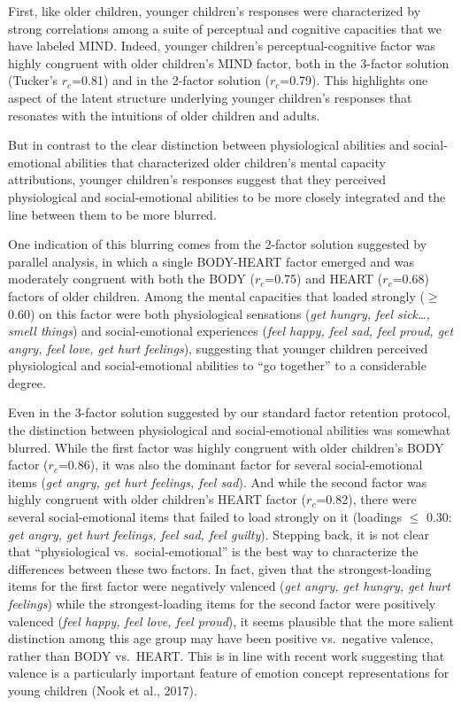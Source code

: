 \documentclass[10pt, letterpaper]{article}
\begin{document}
First, like older children, younger children's responses were
characterized by strong correlations among a suite of perceptual and
cognitive capacities that we have labeled MIND. Indeed, younger
children's perceptual-cognitive factor was highly congruent with older
children's MIND factor, both in the 3-factor solution (Tucker's
\emph{\(r_c\)}=0.81) and in the 2-factor solution (\emph{\(r_c\)}=0.79).
This highlights one aspect of the latent structure underlying younger
children's responses that resonates with the intuitions of older
children and adults.

But in contrast to the clear distinction between physiological abilities
and social-emotional abilities that characterized older children's
mental capacity attributions, younger children's responses suggest that
they perceived physiological and social-emotional abilities to be more
closely integrated and the line between them to be more blurred.

One indication of this blurring comes from the 2-factor solution
suggested by parallel analysis, in which a single BODY-HEART factor
emerged and was moderately congruent with both the BODY
(\emph{\(r_c\)}=0.75) and HEART (\emph{\(r_c\)}=0.68) factors of older
children. Among the mental capacities that loaded strongly (\(\geq\)
0.60) on this factor were both physiological sensations (\emph{get
hungry, feel sick\ldots{}, smell things}) and social-emotional
experiences (\emph{feel happy, feel sad, feel proud, get angry, feel
love, get hurt feelings}), suggesting that younger children perceived
physiological and social-emotional abilities to ``go together'' to a
considerable degree.

Even in the 3-factor solution suggested by our standard factor retention
protocol, the distinction between physiological and social-emotional
abilities was somewhat blurred. While the first factor was highly
congruent with older children's BODY factor (\emph{\(r_c\)}=0.86), it
was also the dominant factor for several social-emotional items
(\emph{get angry, get hurt feelings, feel sad}). And while the second
factor was highly congruent with older children's HEART factor
(\emph{\(r_c\)}=0.82), there were several social-emotional items that
failed to load strongly on it (loadings \(\leq\) 0.30: \emph{get angry,
get hurt feelings, feel sad, feel guilty}). Stepping back, it is not
clear that ``physiological vs.~social-emotional'' is the best way to
characterize the differences between these two factors. In fact, given
that the strongest-loading items for the first factor were negatively
valenced (\emph{get angry, get hungry, get hurt feelings}) while the
strongest-loading items for the second factor were positively valenced
(\emph{feel happy, feel love, feel proud}), it seems plausible that the
more salient distinction among this age group may have been positive
vs.~negative valence, rather than BODY vs.~HEART. This is in line with
recent work suggesting that valence is a particularly important feature
of emotion concept representations for young children (Nook et al.,
2017).
\end{document}
